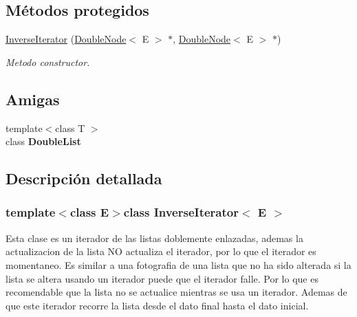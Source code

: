 \subsection*{Métodos protegidos}
\begin{DoxyCompactItemize}
\item 
\hyperlink{classInverseIterator_a31703976cbdca73a1035f47509e8229d}{Inverse\-Iterator} (\hyperlink{classDoubleNode}{Double\-Node}$<$ E $>$ $\ast$, \hyperlink{classDoubleNode}{Double\-Node}$<$ E $>$ $\ast$)
\begin{DoxyCompactList}\small\item\em Metodo constructor. \end{DoxyCompactList}\end{DoxyCompactItemize}
\subsection*{Amigas}
\begin{DoxyCompactItemize}
\item 
\hypertarget{classInverseIterator_ad435a9844a002995926acf522128f7a8}{{\footnotesize template$<$class T $>$ }\\class {\bfseries Double\-List}}\label{classInverseIterator_ad435a9844a002995926acf522128f7a8}

\end{DoxyCompactItemize}


\subsection{Descripción detallada}
\subsubsection*{template$<$class E$>$class Inverse\-Iterator$<$ E $>$}

Esta clase es un iterador de las listas doblemente enlazadas, ademas la actualizacion de la lista N\-O actualiza el iterador, por lo que el iterador es momentaneo. Es similar a una fotografia de una lista que no ha sido alterada si la lista se altera usando un iterador puede que el iterador falle. Por lo que es recomendable que la lista no se actualice mientras se usa un iterador. Ademas de que este iterador recorre la lista desde el dato final hasta el dato inicial. 

